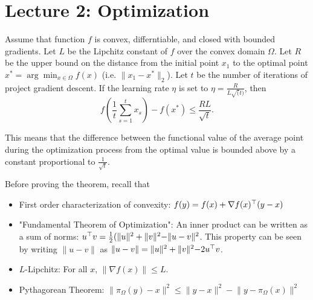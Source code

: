 \section{Lecture 2: Optimization}


\begin{theorem}

Assume that function $f$ is convex, differntiable, and closed with bounded
gradients. Let $L$ be the Lipchitz constant of $f$ over the convex domain
$\Omega$. Let $R$ be the upper bound on the distance from the initial point
$x_1$ to the optimal point $x^* = \arg\min_{x \in \Omega} f(x)$ (i.e. $\lVert
x_1 - x^* \rVert_2$). Let $t$ be the number of iterations of project gradient
descent. If the learning rate $\eta$ is set to $\eta=\frac{R}{L \sqrt(t)}$,
then $$f\left(\frac{1}{t}\sum_{s=1}^t x_s\right) - f\left(x^*\right) \leq
\frac{RL}{\sqrt{t}}.$$ \end{theorem}

This means that the difference between the functional value of the average
point during the optimization process from the optimal value is bounded above
by a constant proportional to $\frac{1}{\sqrt{t}}$. 

Before proving the theorem, recall that
\begin{itemize}

    \item First order characterization of convexity: $f(y) = f(x) + \nabla
    f(x)^\top (y - x)$

    \item "Fundamental Theorem of Optimization": An inner product can be
    written as a sum of norms: $u^\top v = \frac{1}{2}(\lVert u \rVert^2 +
    \lVert v \lVert^2 - \lVert u - v \rVert^2$. This property can be seen by
    writing $\lVert u - v \rVert$ as $\lVert u - v \rVert = \lVert u \rVert^2 +
    \lVert v \lVert^2 - 2 u^\top v$.
    
    \item $L$-Lipchitz: For all $x$, $\lVert \nabla f(x) \rVert \leq L$.
    
    \item Pythagorean Theorem: $\lVert \pi_\Omega (y) - x \rVert^2 \leq \lVert
    y - x \rVert^2 - \lVert y - \pi_\Omega (x) \rVert^2$

\end{itemize}

